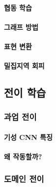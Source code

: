 \documentclass [12pt] {oblivoir}
\let\oldsubsubsection=\subsubsection
\renewcommand{\subsubsection}
{
  \filbreak
  \oldsubsubsection
}
\begin{document}
\paragraph*{협동 학습}\mbox{}

\vspace{3mm}

\paragraph*{그래프 방법}\mbox{}

\vspace{3mm}

\paragraph*{표현 변환}\mbox{}

\vspace{3mm}

\paragraph*{밀집지역 회피}\mbox{}

\vspace{3mm}

\subsection{전이 학습}

\subsubsection{과업 전이}

\paragraph*{기성 CNN 특징}\mbox{}

\vspace{3mm}

\paragraph*{왜 작동할까?}\mbox{}

\vspace{3mm}

\subsubsection{도메인 전이}
\end{document}
